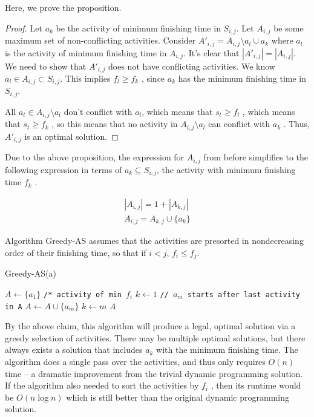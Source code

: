 \documentclass [12pt]{article}
\theoremstyle{definition}
\begin{document}
Here, we prove the proposition.

\begin{proof}

Let $a_k$ be the activity of minimum finishing time in $S_{i ,j}$. Let $A_{i ,j}$ be some maximum set of non-conflicting activities. Consider $A'_{i ,j} = A_{i ,j} \setminus {a_l} \cup {a_k}$ where $a_l$ is the activity of minimum finishing time in $A_{i ,j}$. It’s clear that $|A'_{i ,j}| = |A_{i ,j}|$. We need to show that $A'_{i ,j}$ does not have conflicting activities. We know $a_l \in A_{i ,j} \subset S_{i ,j}$. This implies $f_l \geq f_k$ , since $a_k$ has the minimum finishing time in $S_{i ,j}$. 

All $a_t \in A_{i ,j} \setminus {a_l}$ don’t conflict with $a_l $, which means that $s_t \geq f_l$ , which means that $s_t \geq f_k$ , so this means that no activity in $A_{i ,j} \setminus {a_l}$ can conflict with $a_k$ . Thus, $A'_{i ,j}$ is an optimal solution.
\end{proof}

Due to the above proposition, the expression for $A_{i ,j}$ from before simplifies to the following
expression in terms of $a_k \subseteq S_{i ,j}$, the activity with minimum finishing time $f_k$ .

\begin{align*}
|A_{i,j}| = 1 + |A_{k,j}| \\
A_{i,j} = A_{k,j} \cup \{a_k \}
\end{align*}

Algorithm Greedy-AS assumes that the activities are presorted in nondecreasing order of their finishing time, so that if $i < j$, $f_i \leq f_j$.

\begin{algorithm}
\caption{Greedy-AS(a)}
\label{alg:greed_as}
\begin{algorithmic}
\State $A \gets \{a_1\}$ \texttt{/* activity of min $f_i$}
\State $k \gets 1$
        \State \texttt{// $a_m$ starts after last activity in A}
        \State $A \gets A \cup \{a_m\}$
        \State $k \gets m$
    \EndIf
\EndFor
\Return $A$
\end{algorithmic}
\end{algorithm}


By the above claim, this algorithm will produce a legal, optimal solution via a greedy selection of activities. There may be multiple optimal solutions, but there always exists a solution that includes $a_k$ with the minimum finishing time. The algorithm does a single pass over the activities, and thus only requires $O(n)$ time – a dramatic improvement from the trivial dynamic programming solution. If the algorithm also needed to sort the activities by $f_i$ , then its runtime would be $O(n \log n)$ which is still better than the original dynamic programming solution.
\end{document}

